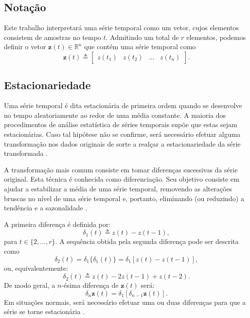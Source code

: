 \subsection{Notação}
Este trabalho interpretará uma série temporal como um vetor, cujos elementos consistem de amostras no tempo $t$. Admitindo um total de $r$ elementos, podemos definir o vetor $\boldsymbol{z}(t) \in \mathbb{R}^n$ que contém uma série temporal como
\begin{equation}
\boldsymbol{z}(t) \triangleq \begin{bmatrix}z(t_1) & z(t_2) & \ldots & z(t_n)\end{bmatrix}.
\end{equation}
 
 \subsection{Estacionariedade}
 
 Uma série temporal é dita estacionária de primeira ordem quando se desenvolve no tempo aleatoriamente ao redor de uma média constante. A maioria dos procedimentos de análise estatística de séries temporais supõe que estas sejam estacionárias. Caso tal hipótese não se confirme, será necessário efetuar alguma transformação nos dados originais de sorte a realçar a estacionariedade da série transformada \cite{grenander1957statistical}.

 A transformação mais comum consiste em tomar diferenças sucessivas da série original. Esta técnica é conhecida como diferenciação. Seu objetivo consiste em ajudar a estabilizar a média de uma série temporal, removendo as alterações bruscas no nível de uma série temporal e, portanto, eliminando (ou reduzindo) a tendência e a sazonalidade \cite{morettin2006analise, hyndman2018forecasting}.
 

 
 A primeira diferença é definida por:
\begin{equation} 
\delta_1(t) \triangleq z(t) - z(t - 1),
\end{equation}
para $t \in \{2,\ldots,r\}$. A sequência obtida pela segunda diferença pode ser descrita como
\begin{equation}
\delta_2(t) = \delta_1\{\delta_1(t)\} = \delta_1[z(t) - z(t - 1)],
\end{equation}
ou, equivalentemente:
\begin{equation}
\delta_2(t) \triangleq z(t) - 2z(t - 1) + z(t - 2).
\end{equation}
De modo geral, a $n$-ésima diferença de $\boldsymbol{z}(t)$ será:
\begin{equation}
\delta_n\boldsymbol{z}(t) = \delta_1[\delta_{n-1}\boldsymbol{z}(t)].
\end{equation}
Em situações normais, será necessário efetuar uma ou duas diferenças para que a série se torne estacionária \cite{morettin2006analise}.

